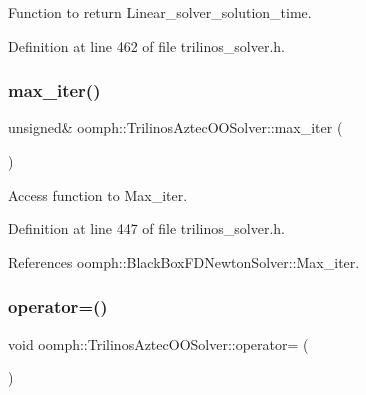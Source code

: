 Function to return Linear\+\_\+solver\+\_\+solution\+\_\+time. 



Definition at line 462 of file trilinos\+\_\+solver.\+h.

\mbox{\label{classoomph_1_1TrilinosAztecOOSolver_a5e98e3624970a772e8ddbbcb6c92c24f}} 
\subsubsection{\texorpdfstring{max\+\_\+iter()}{max\_iter()}}
{\footnotesize\ttfamily unsigned\& oomph\+::\+Trilinos\+Aztec\+O\+O\+Solver\+::max\+\_\+iter (\begin{DoxyParamCaption}{ }\end{DoxyParamCaption})\hspace{0.3cm}{\ttfamily [inline]}}



Access function to Max\+\_\+iter. 



Definition at line 447 of file trilinos\+\_\+solver.\+h.



References oomph\+::\+Black\+Box\+F\+D\+Newton\+Solver\+::\+Max\+\_\+iter.

\mbox{\label{classoomph_1_1TrilinosAztecOOSolver_a3cdd18905633b615dbdf5bdb2d80d4d3}} 
\subsubsection{\texorpdfstring{operator=()}{operator=()}}
{\footnotesize\ttfamily void oomph\+::\+Trilinos\+Aztec\+O\+O\+Solver\+::operator= (\begin{DoxyParamCaption}\item[{const \hyperlink{classoomph_1_1TrilinosAztecOOSolver}{Trilinos\+Aztec\+O\+O\+Solver} \&}]{ }\end{DoxyParamCaption})\hspace{0.3cm}{\ttfamily [inline]}}



